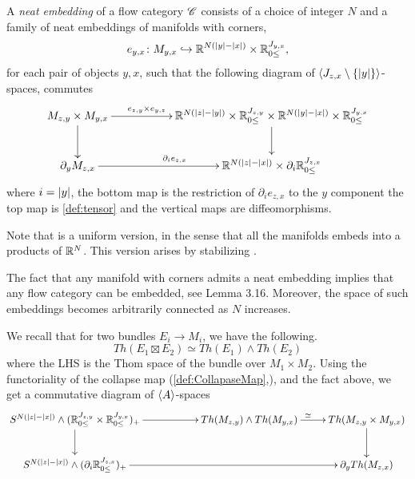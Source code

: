 \begin{defn}
    A \emph{neat embedding} of a flow category $\mathscr{C}$ consists of a choice of integer $N$ and a family of neat embeddings of manifolds with corners,
    \begin{equation*}
        e_{y,x}\colon M_{y,x} \hookrightarrow \mathbb{R}^{N(\left\lvert y\right\rvert-\left\lvert x\right\rvert)} \times \mathbb{R}_{0 \leq}^{J_{y,x}},
    \end{equation*}
    for each pair of objects $y,x$, such that the following diagram of $\langle J_{z,x}\setminus\{\left\lvert y\right\rvert\} \rangle$-spaces, commutes
    \begin{equation*}
        \xymatrix
        {
            M_{z,y}\times M_{y,x} \ar[rr]^{\hspace{-50pt}e_{z,y}\times e_{y,z}}\ar[d] && \bbR^{N(\norm{z}-\norm{y})} \times \Hlf^{J_{z,y}} \times \bbR^{N(\norm{y}-\norm{x})} \times \Hlf^{J_{y,x}} \ar[d] \\
            \partial_y M_{z,x} \ar[rr]^{\partial_i e_{z,x}} && \bbR^{N(\norm{z}-\norm{x})} \times \partial_i \Hlf^{J_{z,x}}   
        }
    \end{equation*}
    where $i = \left\lvert y\right\rvert$, the bottom map is the restriction of $\partial_i e_{z,x}$ to the $y$ component the top map is \cref{def:tensor} and the vertical maps are diffeomorphisms.
\end{defn}

Note that is a uniform version, in the sense that all the manifolds embeds into a products of $\mathbb{R}^N$. This version arises by stabilizing \cite{LS14}.

\begin{rem}\label{rem:Cat_emb}
The fact that any manifold with corners admits a neat embedding implies that any flow category can be embedded, see \cite{LS14} Lemma 3.16. Moreover, the space of such embeddings becomes arbitrarily connected as $N$ increases.
\end{rem}

We recall that for two bundles $E_i \to M_i$, we have the following. 
\begin{equation*}
    Th(E_1 \boxtimes  E_2) \simeq Th(E_1) \wedge Th(E_2)
\end{equation*}
where the LHS is the Thom space of the bundle over $M_1 \times M_2$.
Using the functoriality of the collapse map (\cref{def:CollapaseMap},), and the fact above, we get a commutative diagram of $\langle A \rangle$-spaces
\begin{equation}\label{eq:collaps_comp}
    \xymatrix{
    S^{N(\norm{z}-\norm{x})}\wedge (\Hlf^{J_{z,y}} \times \Hlf^{J_{y,x}})_+ \ar[d] \ar[rr] && Th(M_{z,y}) \wedge Th(M_{y,x}) \ar[r]^{\simeq}&   Th(M_{z,y} \times M_{y,x})  \ar[d] \\
    S^{N(\norm{z}-\norm{x})}\wedge (\partial_i \Hlf^{J_{z,x}})_+ \ar[rrr] &&& \partial_y Th(M_{z,x})
    }
\end{equation}


